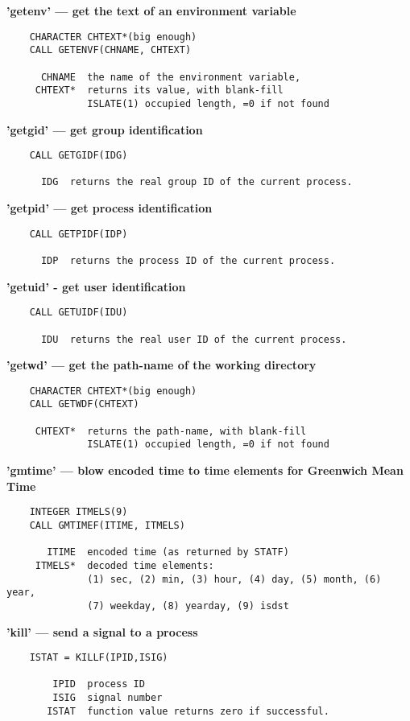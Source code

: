 \newpage
{\bf 'getenv' --- get the text of an environment variable}
\begin{verbatim}
    CHARACTER CHTEXT*(big enough)
    CALL GETENVF(CHNAME, CHTEXT)
 
      CHNAME  the name of the environment variable,
     CHTEXT*  returns its value, with blank-fill
              ISLATE(1) occupied length, =0 if not found
\end{verbatim}
 
{\bf 'getgid' --- get group identification}
\begin{verbatim}
    CALL GETGIDF(IDG)
 
      IDG  returns the real group ID of the current process.
\end{verbatim}
 
{\bf 'getpid' --- get process identification}
\begin{verbatim}
    CALL GETPIDF(IDP)
 
      IDP  returns the process ID of the current process.
\end{verbatim}
 
{\bf 'getuid' - get user identification}
\begin{verbatim}
    CALL GETUIDF(IDU)
 
      IDU  returns the real user ID of the current process.
\end{verbatim}
 
{\bf 'getwd' --- get the path-name of the working directory}
\begin{verbatim}
    CHARACTER CHTEXT*(big enough)
    CALL GETWDF(CHTEXT)
 
     CHTEXT*  returns the path-name, with blank-fill
              ISLATE(1) occupied length, =0 if not found
\end{verbatim}
 
{\bf 'gmtime' --- blow encoded time to time elements for
Greenwich Mean Time}
\begin{verbatim}
    INTEGER ITMELS(9)
    CALL GMTIMEF(ITIME, ITMELS)
 
       ITIME  encoded time (as returned by STATF)
     ITMELS*  decoded time elements:
              (1) sec, (2) min, (3) hour, (4) day, (5) month, (6) year,
              (7) weekday, (8) yearday, (9) isdst
\end{verbatim}
 
{\bf 'kill' --- send a signal to a process}
\begin{verbatim}
    ISTAT = KILLF(IPID,ISIG)
 
        IPID  process ID
        ISIG  signal number
       ISTAT  function value returns zero if successful.
\end{verbatim}
 
